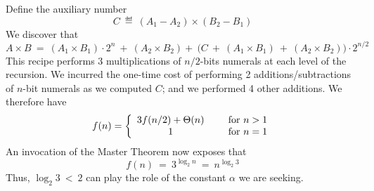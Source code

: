 \begin{itemize}
\begin{enumerate}
Define the auxiliary number
\[ C \ \eqdef \ (A_1 - A_2) \times (B_2 - B_1) \]
We discover that
\[
A \times B \ = \ (A_1 \times B_1) \cdot 2^n \ + \ (A_2 \times B_2) + \ \big(C \ + \ (A_1 \times B_1) \ + \ (A_2 \times B_2) \big) \cdot 2^{n/2}
\]
This recipe performs 3 multiplications of $n/2$-bits numerals at each level of the recursion.  We incurred the one-time cost of performing 2 additions/subtractions of $n$-bit numerals as we computed $C$; and we performed 4 other additions.   We therefore have
\[
f(n) = \left\{
\begin{array}{cl}
3 f(n/2) + \Theta(n) & \hspace*{.2in} \mbox{for } n > 1 \\
                            1 & \hspace*{.2in} \mbox{for } n = 1
\end{array}
\right. 
\]
An invocation of the Master Theorem now exposes that
\[ f(n) \ = \ 3^{\log_2 n} \ = \ n^{\log_2 3} \]
Thus, $\log_2 3 \ < \ 2$ can play the role of the constant $\alpha$ we are seeking.
\end{enumerate}
\end{itemize}




